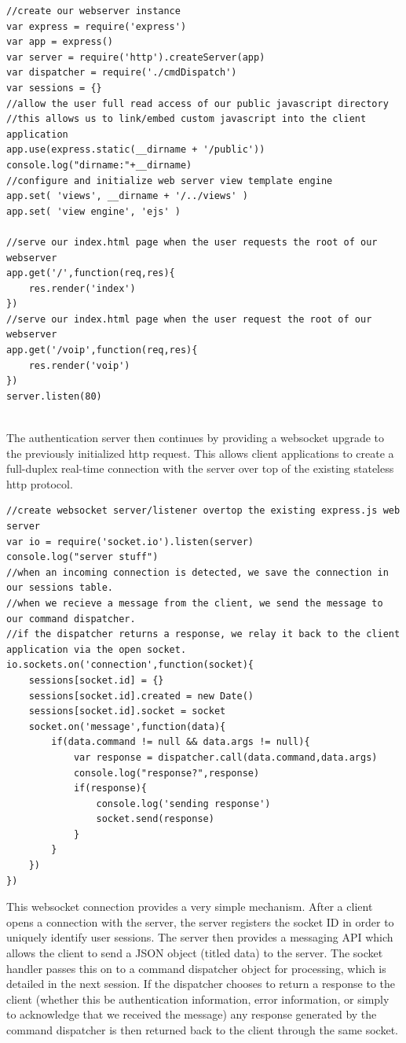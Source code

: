\documentclass[a4paper,12pt]{report}
\begin{document}
\begin{lstlisting}
//create our webserver instance
var express = require('express')
var app = express()
var server = require('http').createServer(app)
var dispatcher = require('./cmdDispatch') 
var sessions = {}
//allow the user full read access of our public javascript directory
//this allows us to link/embed custom javascript into the client application
app.use(express.static(__dirname + '/public'))
console.log("dirname:"+__dirname)
//configure and initialize web server view template engine
app.set( 'views', __dirname + '/../views' )
app.set( 'view engine', 'ejs' )

//serve our index.html page when the user requests the root of our webserver
app.get('/',function(req,res){
	res.render('index')
})
//serve our index.html page when the user request the root of our webserver
app.get('/voip',function(req,res){
	res.render('voip')
})
server.listen(80)


\end{lstlisting}

The authentication server then continues by providing a websocket upgrade to the previously initialized http request. This allows client applications to create a full-duplex real-time connection with the server over top of the existing stateless http protocol.

\begin{lstlisting}
//create websocket server/listener overtop the existing express.js web server
var io = require('socket.io').listen(server)
console.log("server stuff")
//when an incoming connection is detected, we save the connection in our sessions table.
//when we recieve a message from the client, we send the message to our command dispatcher.
//if the dispatcher returns a response, we relay it back to the client application via the open socket.
io.sockets.on('connection',function(socket){
	sessions[socket.id] = {}
	sessions[socket.id].created = new Date()
	sessions[socket.id].socket = socket
	socket.on('message',function(data){
		if(data.command != null && data.args != null){
			var response = dispatcher.call(data.command,data.args)
			console.log("response?",response)
			if(response){
				console.log('sending response')
				socket.send(response)
			}
		}
	})
})

\end{lstlisting}

This websocket connection provides a very simple mechanism. After a client opens a connection with the server, the server registers the socket ID in order to uniquely identify user sessions. The server then provides a messaging API which allows the client to send a JSON object (titled data) to the server. The socket handler passes this on to a command dispatcher object for processing, which is detailed in the next session. If the dispatcher chooses to return a response to the client (whether this be authentication information, error information, or simply to acknowledge that we received the message) any response generated by the command dispatcher is then returned back to the client through the same socket.
\end{document}
